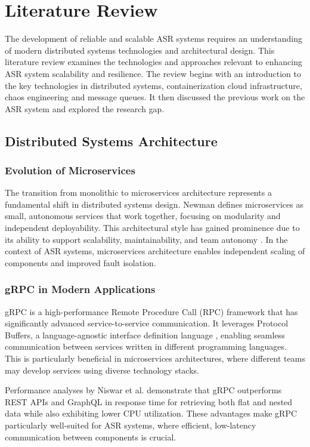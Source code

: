 \chapter{Literature Review} \label{chapter:literature_review}
The development of reliable and scalable ASR systems requires an understanding of modern distributed systems technologies and architectural design. This literature review examines the technologies and approaches relevant to enhancing ASR system scalability and resilience. The review begins with an introduction to the key technologies in distributed systems, containerization cloud infrastructure, chaos engineering and message queues. It then discussed the previous work on the ASR system and explored the research gap.

\section{Distributed Systems Architecture}
\subsection{Evolution of Microservices}
The transition from monolithic to microservices architecture represents a fundamental shift in distributed systems design. Newman \cite{newman} defines microservices as small, autonomous services that work together, focusing on modularity and independent deployability. This architectural style has gained prominence due to its ability to support scalability, maintainability, and team autonomy \cite{microservices_benefits}. In the context of ASR systems, microservices architecture enables independent scaling of components and improved fault isolation.

\subsection{gRPC in Modern Applications}
gRPC is a high-performance Remote Procedure Call (RPC) framework \cite{grpc} that has significantly advanced service-to-service communication. It leverages Protocol Buffers, a language-agnostic interface definition language \cite{protocol_buffers}, enabling seamless communication between services written in different programming languages. This is particularly beneficial in microservices architectures, where different teams may develop services using diverse technology stacks. 

Performance analyses by Niswar et al. \cite{grpc_comparison} demonstrate that gRPC outperforms REST APIs and GraphQL in response time for retrieving both flat and nested data while also exhibiting lower CPU utilization. These advantages make gRPC particularly well-suited for ASR systems, where efficient, low-latency communication between components is crucial.

